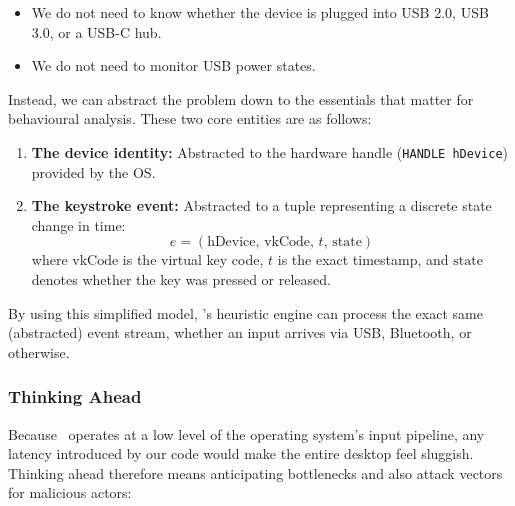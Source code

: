 \begin{itemize}
	\item We do not need to know whether the device is plugged into USB 2.0, USB 3.0, or a USB-C hub.
	\item We do not need to monitor USB power states.
\end{itemize}

Instead, we can abstract the problem down to the essentials that matter for behavioural analysis. These two core entities are as follows:

\begin{enumerate}
	\item \textbf{The device identity:} Abstracted to the hardware handle (\texttt{HANDLE hDevice}) provided by the OS.
	\item \textbf{The keystroke event:} Abstracted to a tuple representing a discrete state change in time:
	      \begin{equation}
		      e = \left( \text{hDevice},\, \text{vkCode},\, t,\, \text{state} \right)
	      \end{equation}
	      where $\text{vkCode}$ is the virtual key code, $t$ is the exact timestamp, and $\text{state}$ denotes whether the key was pressed or released.
\end{enumerate}

By using this simplified model, \projectNameFormatted's heuristic engine can process the exact same (abstracted) event stream, whether an input arrives via USB, Bluetooth, or otherwise.

\subsubsection{Thinking Ahead}

Because \projectNameFormatted\ operates at a low level of the operating system's input pipeline, any latency introduced by our code would make the entire desktop feel sluggish. Thinking ahead therefore means anticipating bottlenecks and also attack vectors for malicious actors:

